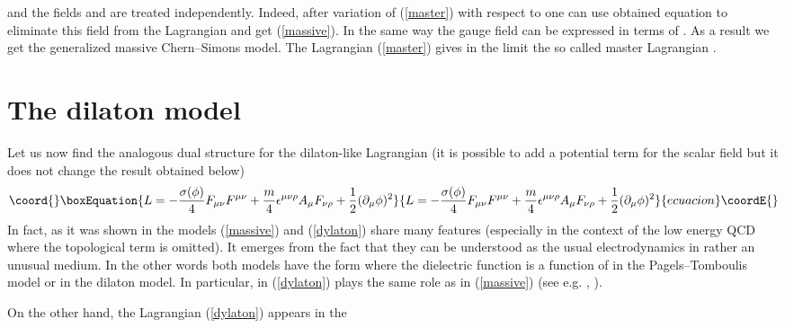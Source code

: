 \documentclass[a4 paper, 12 pt] {article}
\begin{document}
and the fields \coordHE{} and \coordHE{} are treated independently.
Indeed, after variation of (\ref{master}) with respect to \coordHE{} one
can use obtained equation to eliminate this field from the Lagrangian and
get (\ref{massive}). In the same way the gauge field \coordHE{} can be
expressed in terms of \coordHE{}. As a result we get the generalized
massive Chern--Simons model. The Lagrangian (\ref{master}) gives in the
limit \coordHE{} the so called master Lagrangian \cite{Jackiw}.
\section{\bf{The dilaton model}}
Let us now find the analogous dual structure for the dilaton-like
Lagrangian (it is possible to add a potential term for the scalar
field but it does not change the result obtained below)
\begin{equation}\coord{}\boxEquation{
L=-\frac{\sigma (\phi )}{4} F_{\mu \nu } F^{\mu \nu } +\frac{m}{4}
\epsilon^{\mu \nu \rho } A_{\mu } F_{\nu \rho} +\frac{1}{2}
(\partial_{\mu } \phi )^2
\label{dylaton}
}{
L=-\frac{\sigma (\phi )}{4} F_{\mu \nu } F^{\mu \nu } +\frac{m}{4}
\epsilon^{\mu \nu \rho } A_{\mu } F_{\nu \rho} +\frac{1}{2}
(\partial_{\mu } \phi )^2
}{ecuacion}\coordE{}\end{equation}
In fact, as it was shown in \cite{Pagels} the models
(\ref{massive}) and (\ref{dylaton}) share many features
(especially in the context of the low energy QCD where the
topological term is omitted). It emerges from the fact that they
can be understood as the usual electrodynamics in rather an
unusual medium. In the other words both models have the form \coordHE{} where the dielectric function
\myHighlight{$\epsilon $}\coordHE{} is a function of \coordHE{} in the
Pagels--Tomboulis model or \myHighlight{$\phi $}\coordHE{} in the dilaton model. In
particular, in (\ref{dylaton}) \coordHE{}
plays the same role as \coordHE{} in (\ref{massive}) (see
e.g. \cite{My1}, \cite{My2}).
\par
On the other hand, the Lagrangian (\ref{dylaton}) appears in the
\end{document}

